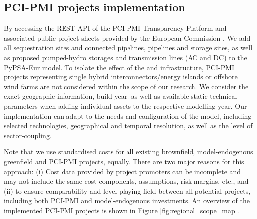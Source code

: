 \documentclass[preprint,12pt]{elsarticle}
\begin{document}
\subsection{PCI-PMI projects implementation}
\label{sec:pci-pmi_projects_implementation}

By accessing the REST API of the PCI-PMI Transparency Platform and associated public project sheets provided by the European Commission \cite{europeancommissionPCIPMITransparencyPlatform2024}. We add all  sequestration sites and connected pipelines,  pipelines and storage sites, as well as proposed pumped-hydro storages and transmission lines (AC and DC) to the PyPSA-Eur model. To isolate the effect of the  and  infrastructure, PCI-PMI projects representing single hybrid interconnectors/energy islands or offshore wind farms are not considered within the scope of our research. We consider the exact geographic information, build year, as well as available static technical parameters when adding individual assets to the respective modelling year. Our implementation can adapt to the needs and configuration of the model, including selected technologies, geographical and temporal resolution, as well as the level of sector-coupling.

Note that we use standardised costs \cite{zeyenPyPSATechnologydataV01012025} for all existing brownfield, model-endogenous greenfield and PCI-PMI projects, equally. There are two major reasons for this approach: (i) Cost data provided by project promoters can be incomplete and may not include the same cost components, assumptions, risk margins, etc., and (ii) to ensure comparability and level-playing field between all potential projects, including both PCI-PMI and model-endogenous investments. An overview of the implemented PCI-PMI projects is shown in Figure \ref{fig:regional_scope_map}.
\end{document}
